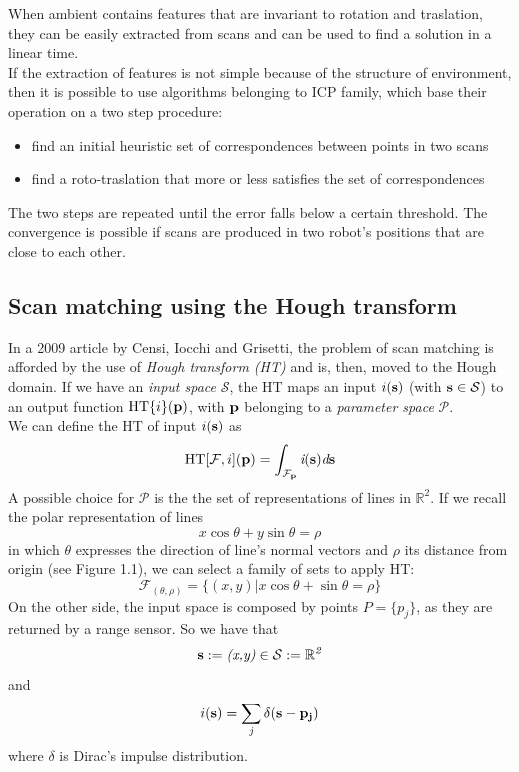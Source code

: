 \documentclass[a4paper, onecolumn]{report}
\begin{document}
When ambient contains features that are invariant to rotation and traslation, they can be easily extracted from scans and can be used to find a solution in a linear time. \\
If the extraction of features is not simple because of the structure of environment, then it is possible to use algorithms belonging to ICP family, which base their operation on a two step procedure:
\begin{itemize}
	\item{find an initial heuristic set of correspondences between points in two scans}
	\item{find a roto-traslation that more or less satisfies the set of correspondences}
\end{itemize}
The two steps are repeated until the error falls below a certain threshold. The convergence is possible if scans are produced in two robot's positions that are close to each other.

\subsection{Scan matching using the Hough transform}
In a 2009 article by Censi, Iocchi and Grisetti, the problem of scan matching is afforded by the use of \emph{Hough transform (HT)} and is, then, moved to the Hough domain. If we have an \emph{input space} $\mathcal{S}$, the HT maps an input $i(\bf{s})$ (with $\bf{s} \in \mathcal{S}$) to an output function $\mbox{HT}\{i\}(\bf{p})$, with $\bf{p}$ belonging to a \emph{parameter space} $\mathcal{P}$. \\
We can define the HT of input $i(\bf{s})$ as
\begin{equation}
	\mbox{HT}[\mathcal{F}, i](\bf{p}) = \int_{\mathcal{F}_{\bf{p}}} \emph{i}(\bf{s}) \emph{d}\bf{s}
\end{equation}
A possible choice for $\mathcal{P}$ is the the set of representations of lines in $\mathbb{R}^2$. If we recall the polar representation of lines 
\begin{equation}
	x\cos\theta + y\sin\theta = \rho
\end{equation}
in which $\theta$ expresses the direction of line's normal vectors and $\rho$ its distance from origin (see Figure 1.1), we can select a family of sets to apply HT:
\begin{equation}
	\mathcal{F}_{(\theta, \rho)} =\{(x,y) | x\cos\theta + \sin\theta = \rho\}
\end{equation}
On the other side, the input space is composed by points $P = \{p_j\}$, as they are returned by a range sensor. So we have that
\begin{equation}
	\bf{s} := \emph{(x,y)} \in \mathcal{S} := \mathbb{R}^\emph{2}
\end{equation}
and
\begin{equation}
	i(\bf{s}) = \sum_{\emph{j}} \delta(\bf{s} - \bf{p_j})
\end{equation}
where $\delta$ is Dirac's impulse distribution.
\end{document}

